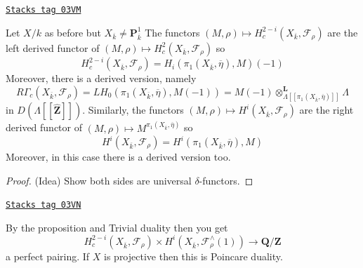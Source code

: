 \begin{proposition}
\label{trace-proposition-curve-kpi1}
\href{https://stacks.math.columbia.edu/tag/03VM}{\texttt{Stacks tag 03VM}}

Let $X/k$ as before but $X_{\overline{k}}\neq \mathbf{P}^1_{\overline{k}}$
The functors
$
(M, \rho)\mapsto H_c^{2-i}(X_{\overline{k}}, \mathcal{F}_\rho)
$
are the left derived functor of
$(M, \rho)\mapsto H_c^2(X_{\overline{k}}, \mathcal{F}_\rho)$
so
$$
H_c^{2-i}(X_{\overline{k}}, \mathcal{F}_\rho) =
H_i(\pi_1(X_{\overline{k}}, \overline \eta), M)(-1)
$$
Moreover, there is a derived version, namely
$$
R\Gamma_c(X_{\overline{k}}, \mathcal{F}_\rho)
=
LH_0(\pi_1(X_{\overline{k}}, \overline \eta), M(-1))
=
M(-1)
\otimes_{\Lambda[[\pi_1(X_{\overline{k}}, \overline \eta)]]}^\mathbf{L}
\Lambda
$$
in $D(\Lambda[[\widehat{\mathbf{Z}}]])$.
Similarly, the functors
$(M, \rho)\mapsto H^i(X_{\overline{k}}, \mathcal{F}_\rho)$
are the right derived functor of
$(M, \rho)\mapsto M^{\pi_1(X_{\overline{k}}, \overline \eta)}$
so
$$
H^i(X_{\overline{k}}, \mathcal{F}_\rho) =
H^i(\pi_1(X_{\overline{k}}, \overline \eta), M)
$$
Moreover, in this case there is a derived version too.
\end{proposition}

\begin{proof}
(Idea) Show both sides are universal $\delta$-functors.
\end{proof}

\begin{remark}
\label{trace-remark-poincare-groups}
\href{https://stacks.math.columbia.edu/tag/03VN}{\texttt{Stacks tag 03VN}}

By the proposition and Trivial duality then you get
$$
H^{2-i}_c(X_{\overline{k}}, \mathcal{F}_\rho)
\times
H^i(X_{\overline{k}}, \mathcal{F}_\rho^\wedge(1))
\to
\mathbf{Q}/\mathbf{Z}
$$
a perfect pairing. If $X$ is projective then this is Poincare duality.
\end{remark}

